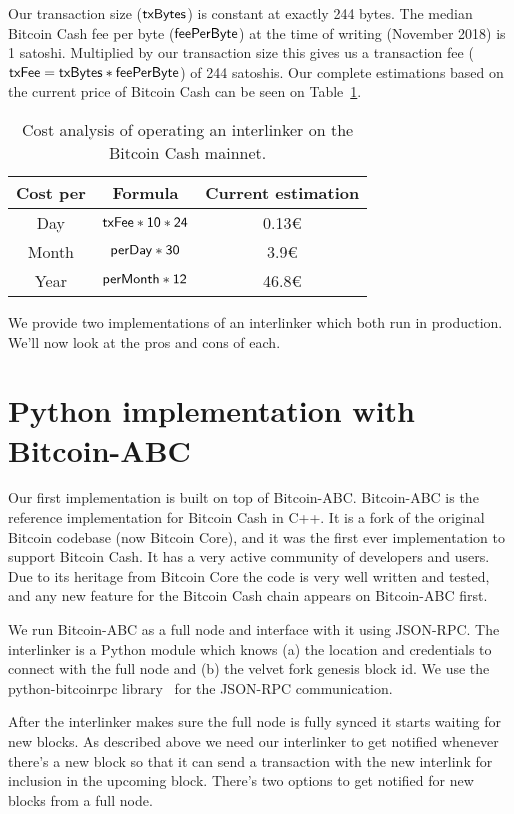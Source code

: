 Our transaction size ($\sf txBytes$) is constant at exactly 244 bytes. The median Bitcoin Cash fee per byte ($\sf feePerByte$) at the time of writing (November 2018) is 1 satoshi. Multiplied by our transaction size this gives us a transaction fee ($\sf txFee = txBytes * feePerByte$) of 244 satoshis.  Our complete estimations based on the current price of Bitcoin Cash can be seen on Table~\ref{tbl:cost-analysis}.

\begin{table}
  \centering
  \begin{tabular}{|c|c|c|}
    \hline
    Cost per & Formula & Current estimation \\
    \hline
    Day & $\sf txFee * 10 * 24$ & 0.13€ \\
    Month & $\sf perDay * 30$ & 3.9€ \\
    Year & $\sf perMonth * 12$ & 46.8€ \\
    \hline
  \end{tabular}
  \caption{Cost analysis of operating an interlinker on the Bitcoin Cash mainnet.}
  \label{tbl:cost-analysis}
\end{table}

We provide two implementations of an interlinker which both run in production. We'll now look at the pros and cons of each.

\section{Python implementation with Bitcoin-ABC}
Our first implementation is built on top of Bitcoin-ABC. Bitcoin-ABC is the reference implementation for Bitcoin Cash in C++. It is a fork of the original Bitcoin codebase (now Bitcoin Core), and it was the first ever implementation to support Bitcoin Cash. It has a very active community of developers and users. Due to its heritage from Bitcoin Core the code is very well written and tested, and any new feature for the Bitcoin Cash chain appears on Bitcoin-ABC first.

We run Bitcoin-ABC as a full node and interface with it using JSON-RPC. The interlinker is a Python module which knows (a) the location and credentials to connect with the full node and (b) the velvet fork genesis block id. We use the python-bitcoinrpc library~\cite{python-bitcoinrpc} for the JSON-RPC communication.

After the interlinker makes sure the full node is fully synced it starts waiting for new blocks. As described above we need our interlinker to get notified whenever there's a new block so that it can send a transaction with the new interlink for inclusion in the upcoming block. There's two options to get notified for new blocks from a full node.

